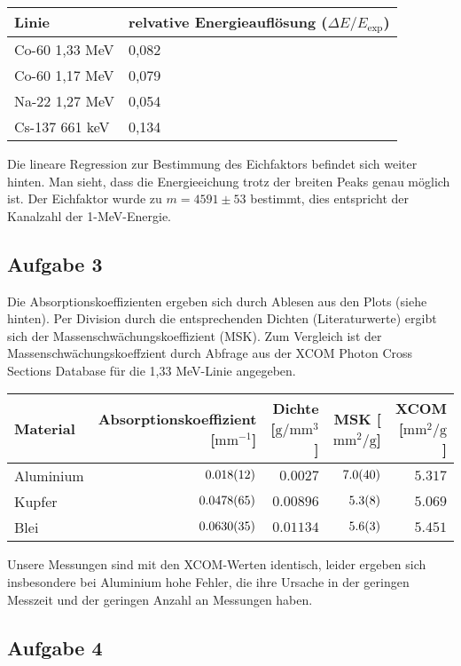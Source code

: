 \documentclass[a4paper,german,12pt,smallheadings]{scrartcl}
\begin{document}
\begin{tabular}{l|l}
  Linie & relvative Energieauflösung ($\Delta E/E_\text{exp}$) \\
  \hline
  Co-60 1{,}33 MeV & 0{,}082 \\
  Co-60 1{,}17 MeV & 0{,}079 \\
  Na-22 1{,}27 MeV & 0{,}054 \\
  Cs-137 661 keV & 0{,}134 \\
\end{tabular}
\vspace{22pt}

Die lineare Regression zur Bestimmung des Eichfaktors befindet sich weiter
hinten. Man sieht, dass die Energieeichung trotz der breiten Peaks genau
möglich ist. Der Eichfaktor wurde zu $m = 4591\pm53$ bestimmt, dies entspricht
der Kanalzahl der 1-MeV-Energie.

\subsection{Aufgabe 3}

Die Absorptionskoeffizienten ergeben sich durch Ablesen aus den Plots (siehe
hinten). Per Division durch die entsprechenden Dichten (Literaturwerte) ergibt
sich der Massenschwächungskoeffizient (MSK). Zum Vergleich ist der
Massenschwächungskoeffzient durch Abfrage aus der XCOM Photon Cross Sections
Database für die 1{,}33 MeV-Linie angegeben.

\begin{tabular}{l|r|r|r|r}
  Material & Absorptionskoeffizient [$\text{mm}^{-1}$] & Dichte [$\text{g}/\text{mm}^3$]& MSK [$\text{mm}^2/\text{g}$] & XCOM [$\text{mm}^2/\text{g}$] \\
  \hline
  Aluminium & $\num{0.018+-0.012}$ & $\num{0.0027}$ & $\num{7.0+-4.0}$ & $\num{5.317}$\\
  Kupfer & $\num{0.0478+-0.0065}$ & $\num{0.00896}$ & $\num{5.3+-0.8}$ & $\num{5.069}$\\
  Blei & $\num{0.0630+-0.0035}$ & $\num{0.01134}$ & $\num{5.6+-0.3}$   & $\num{5.451}$\\
\end{tabular}
\vspace{22pt}

Unsere Messungen sind mit den XCOM-Werten identisch, leider ergeben sich
insbesondere bei Aluminium hohe Fehler, die ihre Ursache in der geringen
Messzeit und der geringen Anzahl an Messungen haben.

\subsection{Aufgabe 4}
\end{document}
